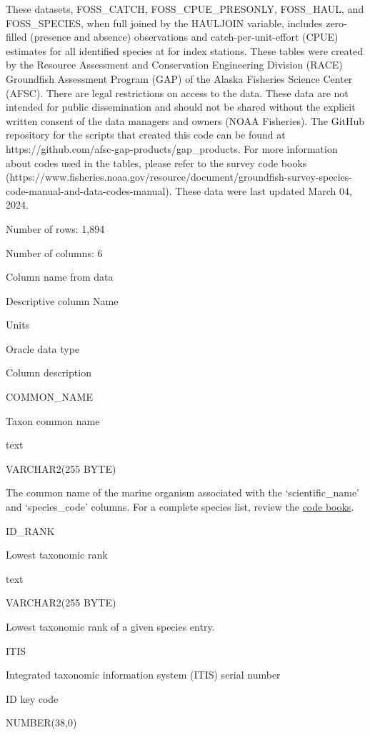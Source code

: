 \documentclass[
  letterpaper,
  oneside,
  open=any]{scrbook}
\begin{document}
These datasets, FOSS\_CATCH, FOSS\_CPUE\_PRESONLY, FOSS\_HAUL, and
FOSS\_SPECIES, when full joined by the HAULJOIN variable, includes
zero-filled (presence and absence) observations and
catch-per-unit-effort (CPUE) estimates for all identified species at for
index stations. These tables were created by the Resource Assessment and
Conservation Engineering Division (RACE) Groundfish Assessment Program
(GAP) of the Alaska Fisheries Science Center (AFSC). There are legal
restrictions on access to the data. These data are not intended for
public dissemination and should not be shared without the explicit
written consent of the data managers and owners (NOAA Fisheries). The
GitHub repository for the scripts that created this code can be found at
https://github.com/afsc-gap-products/gap\_products. For more information
about codes used in the tables, please refer to the survey code books
(https://www.fisheries.noaa.gov/resource/document/groundfish-survey-species-code-manual-and-data-codes-manual).
These data were last updated March 04, 2024.

Number of rows: 1,894

Number of columns: 6

Column name from data

Descriptive column Name

Units

Oracle data type

Column description

COMMON\_NAME

Taxon common name

text

VARCHAR2(255 BYTE)

The common name of the marine organism associated with the
`scientific\_name' and `species\_code' columns. For a complete species
list, review the
\href{https://www.fisheries.noaa.gov/resource/document/groundfish-survey-species-code-manual-and-data-codes-manual}{code
books}.

ID\_RANK

Lowest taxonomic rank

text

VARCHAR2(255 BYTE)

Lowest taxonomic rank of a given species entry.

ITIS

Integrated taxonomic information system (ITIS) serial number

ID key code

NUMBER(38,0)
\end{document}
